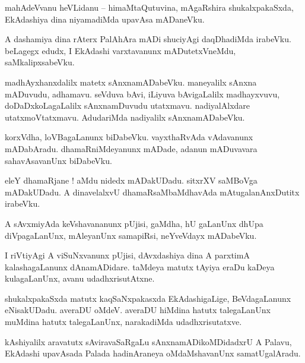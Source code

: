 \documentclass{article}
\begin{document}
\begin{mn}%
mahAdeVvanu heVLidanu -- himaMtaQutuvina, mAgaRshira shukalxpakaSxda, EkAdashiya dina niyamadiMda 
upavAsa mADaneVku.
\end{mn}

\begin{mn}%
A dashamiya dina rAterx PalAhAra mADi shuciyAgi daqDhadiMda irabeVku. beLagegx edudx, I EkAdashi 
varxtavanunx mADutetxVneMdu, saMkalipxsabeVku.
\end{mn}

\begin{mn}%
madhAyxhanxdalilx matetx sAnxnamADabeVku. maneyalilx sAnxna mADuvudu, adhamavu. seVduva bAvi, 
iLiyuva bAvigaLalilx madhayxvuvu, doDaDxkoLagaLalilx sAnxnamDuvudu utatxmavu. nadiyalAlxdare 
utatxmoVtatxmavu. AdudariMda nadiyalilx sAnxnamADabeVku.
\end{mn}

\begin{mn}%
korxVdha, loVBagaLanunx biDabeVku. vayxthaRvAda vAdavanunx mADabAradu. dhamaRniMdeyanunx mADade, 
adanun mADuvavara sahavAsavanUnx biDabeVku.
\end{mn}

\begin{mn}%
eleY dhamaRjane ! aMdu nidedx mADakUDadu. sitxrXV saMBoVga mADakUDadu. A dinavelalxvU 
dhamaRsaMbaMdhavAda mAtugalanAnxDutitx irabeVku.
\end{mn}

\begin{mn}%
A sAvxmiyAda keVshavananunx pUjisi, gaMdha, hU gaLanUnx dhUpa diVpagaLanUnx, mAleyanUnx samapiRsi, 
neYveVdayx mADabeVku.
\end{mn}

\begin{mn}%
I riVtiyAgi A viSuNxvanunx pUjisi, dAvxdashiya dina A parxtimA kalashagaLanunx dAnamADidare. 
taMdeya matutx tAyiya eraDu kaDeya kulagaLanUnx, avanu udadhxrisutAtxne.
\end{mn}

\begin{mn}%
shukalxpakaSxda matutx kaqSaNxpakasxda EkAdashigaLige, BeVdagaLanunx eNisakUDadu. averaDU oMdeV. 
averaDU hiMdina hatutx talegaLanUnx muMdina hatutx talegaLanUnx, narakadiMda udadhxrisutatxve.
\end{mn}

\begin{mn}%
kAshiyalilx aravatutx sAviravaSaRgaLu sAnxnamADikoMDidadxrU A Palavu, EkAdashi upavAsada Palada 
hadinAraneya oMdaMshavanUnx samatUgalAradu.
\end{mn}
\end{document}
